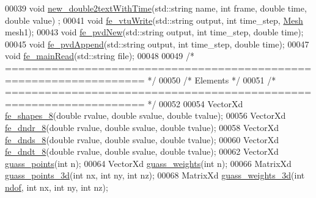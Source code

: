 \begin{DoxyCode}
00039 \textcolor{keywordtype}{void} \hyperlink{functions_8h_ad1e19649d167234a1357071888353496}{new\_double2textWithTime}(std::string name, \textcolor{keywordtype}{int} frame, \textcolor{keywordtype}{double} time, \textcolor{keywordtype}{double} value)
      ;
00041 \textcolor{keywordtype}{void} \hyperlink{functions_8h_a9c39148b76d7691ea87e7f2f88b02295}{fe\_vtuWrite}(std::string output, \textcolor{keywordtype}{int} time\_step, \hyperlink{class_mesh}{Mesh} mesh1);
00043 \textcolor{keywordtype}{void} \hyperlink{functions_8h_aedbf95dc6f02a506b606328037cd58e1}{fe\_pvdNew}(std::string output, \textcolor{keywordtype}{int} time\_step, \textcolor{keywordtype}{double} time);
00045 \textcolor{keywordtype}{void} \hyperlink{functions_8h_ab350b9dfb65474874d79a92f712078a0}{fe\_pvdAppend}(std::string output, \textcolor{keywordtype}{int} time\_step, \textcolor{keywordtype}{double} time);
00047 \textcolor{keywordtype}{void} \hyperlink{functions_8h_a8a64e915e17f876fe72bedd820e87c33}{fe\_mainRead}(std::string file);
00048 
00049 \textcolor{comment}{/* =================================================================== */}
00050 \textcolor{comment}{/* Elements */}
00051 \textcolor{comment}{/* =================================================================== */}
00052 
00054 VectorXd \hyperlink{functions_8h_ab77a3a6d6f6b436d7e8c600bb0869927}{fe\_shapes\_8}(\textcolor{keywordtype}{double} rvalue, \textcolor{keywordtype}{double} svalue, \textcolor{keywordtype}{double} tvalue);
00056 VectorXd \hyperlink{functions_8h_afc547bef246c057db6cbd04bf7f866a9}{fe\_dndr\_8}(\textcolor{keywordtype}{double} rvalue, \textcolor{keywordtype}{double} svalue, \textcolor{keywordtype}{double} tvalue);
00058 VectorXd \hyperlink{functions_8h_ac0b5524525e1f2e89bb064c15ab8e664}{fe\_dnds\_8}(\textcolor{keywordtype}{double} rvalue, \textcolor{keywordtype}{double} svalue, \textcolor{keywordtype}{double} tvalue);
00060 VectorXd \hyperlink{functions_8h_a57e8e5c9f740c98e4767f29c121c2d0a}{fe\_dndt\_8}(\textcolor{keywordtype}{double} rvalue, \textcolor{keywordtype}{double} svalue, \textcolor{keywordtype}{double} tvalue);
00062 VectorXd \hyperlink{functions_8h_aa6ab8c3298fa10734e299fe8266aed35}{guass\_points}(\textcolor{keywordtype}{int} n);
00064 VectorXd \hyperlink{functions_8h_a84dcc9575e861bdb2872c10ba6238ee4}{guass\_weights}(\textcolor{keywordtype}{int} n);
00066 MatrixXd \hyperlink{functions_8h_a502e3469e1cc253deb142f46c0789a78}{guass\_points\_3d}(\textcolor{keywordtype}{int} nx, \textcolor{keywordtype}{int} ny, \textcolor{keywordtype}{int} nz);
00068 MatrixXd \hyperlink{functions_8h_ad99b08ce65ae353e91486d7685c22024}{guass\_weights\_3d}(\textcolor{keywordtype}{int} \hyperlink{_global_variables_8h_aa789fe4d8a13fd0990b630909430d5d0}{ndof}, \textcolor{keywordtype}{int} nx, \textcolor{keywordtype}{int} ny, \textcolor{keywordtype}{int} nz);

\end{DoxyCode}
